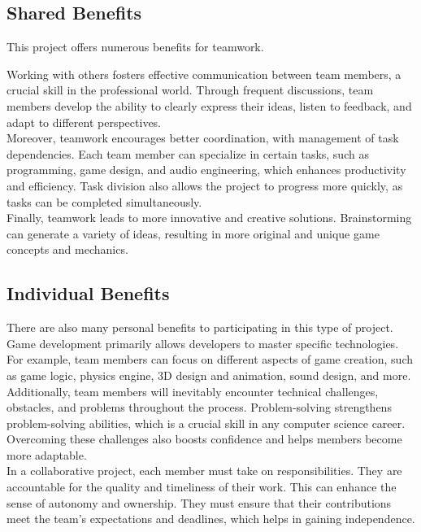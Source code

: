\documentclass{article}
\begin{document}
\subsection{Shared Benefits}\hfill

This project offers numerous benefits for teamwork.

Working with others fosters effective communication between team members, a crucial skill in the professional world. Through frequent discussions, team members develop the ability to clearly express their ideas, listen to feedback, and adapt to different perspectives.\\

Moreover, teamwork encourages better coordination, with management of task dependencies. Each team member can specialize in certain tasks, such as programming, game design, and audio engineering, which enhances productivity and efficiency. Task division also allows the project to progress more quickly, as tasks can be completed simultaneously.\\

Finally, teamwork leads to more innovative and creative solutions. Brainstorming can generate a variety of ideas, resulting in more original and unique game concepts and mechanics.





\subsection{Individual Benefits}\hfill

There are also many personal benefits to participating in this type of project.\\

Game development primarily allows developers to master specific technologies. For example, team members can focus on different aspects of game creation, such as game logic, physics engine, 3D design and animation, sound design, and more.\\

Additionally, team members will inevitably encounter technical challenges, obstacles, and problems throughout the process. Problem-solving strengthens problem-solving abilities, which is a crucial skill in any computer science career. Overcoming these challenges also boosts confidence and helps members become more adaptable.\\

In a collaborative project, each member must take on responsibilities. They are accountable for the quality and timeliness of their work. This can enhance the sense of autonomy and ownership. They must ensure that their contributions meet the team's expectations and deadlines, which helps in gaining independence.\\
\end{document}
